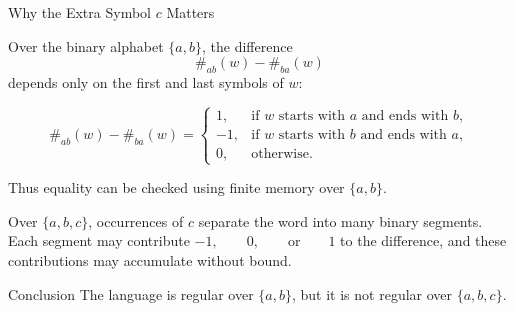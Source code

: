 \documentclass[10pt,aspectratio=169]{beamer}
\begin{document}
\begin{frame}{Why the Extra Symbol \(c\) Matters}

\small
Over the binary alphabet \(\{a,b\}\), the difference
\[
\#_{ab}(w)-\#_{ba}(w)
\]
depends only on the first and last symbols of \(w\):

\[
\#_{ab}(w)-\#_{ba}(w)
=
\begin{cases}
 1, & \text{if \(w\) starts with \(a\) and ends with \(b\)},\\
-1, & \text{if \(w\) starts with \(b\) and ends with \(a\)},\\
 0, & \text{otherwise}.
\end{cases}
\]

Thus equality can be checked using finite memory over \(\{a,b\}\).

\vspace{0.5em}
Over \(\{a,b,c\}\), occurrences of \(c\) separate the word into many
binary segments. Each segment may contribute
\(
-1,\qquad 0,\qquad\text{or}\qquad 1
\)
to the difference, and these contributions may accumulate without
bound.

\begin{alertblock}{Conclusion}
The language is regular over \(\{a,b\}\), but it is not regular over
\(\{a,b,c\}\).
\end{alertblock}

\end{frame}
\end{document}
